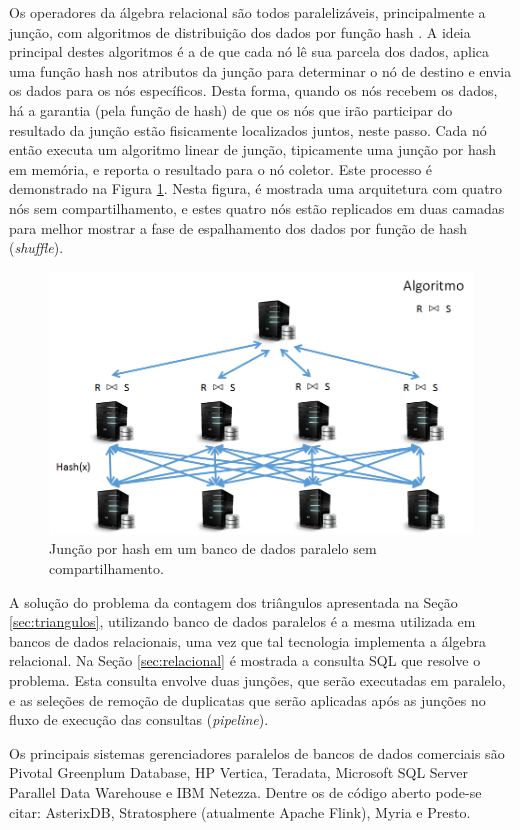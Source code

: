 Os operadores da álgebra relacional são todos paralelizáveis, principalmente
a junção, com algoritmos de distribuição dos dados por função hash 
\citep{Schneider1989}. A ideia principal destes algoritmos é a de que cada 
nó lê sua parcela dos dados, aplica uma função hash nos atributos da
junção para determinar o nó de destino e envia os dados para os nós específicos.
Desta forma, quando os nós recebem os dados, há a garantia (pela
função de hash) de que os nós que irão participar do resultado da junção 
estão fisicamente localizados juntos, neste passo. Cada nó então executa um
algoritmo linear de junção, tipicamente uma junção por hash em memória,
e reporta o resultado para o nó coletor. Este processo é demonstrado na 
Figura \ref{fig:mpp_hashjoin}. Nesta figura, é mostrada uma arquitetura
com quatro nós sem compartilhamento, e estes quatro nós estão replicados 
em duas camadas para melhor mostrar a fase de espalhamento dos dados
por função de hash (\emph{shuffle}).

\begin{figure}[!htbp]
        \centering
        \includegraphics[width=\linewidth]{./mpp_hashjoin.png}
        \caption{Junção por hash em um banco de dados paralelo sem compartilhamento.}
        \label{fig:mpp_hashjoin}
\end{figure}

A solução do problema da contagem dos triângulos apresentada na Seção \ref{sec:triangulos}, utilizando
banco de dados paralelos é a mesma utilizada em bancos de dados relacionais, uma vez que tal tecnologia 
implementa a álgebra relacional. Na Seção \ref{sec:relacional} é mostrada 
a consulta SQL que resolve o problema. Esta consulta envolve duas junções, 
que serão executadas em paralelo, e as seleções de remoção de duplicatas que
serão aplicadas após as junções no fluxo de execução das consultas (\emph{pipeline}).

Os principais sistemas gerenciadores paralelos de bancos de dados comerciais são Pivotal Greenplum Database, 
HP Vertica, Teradata, Microsoft SQL Server Parallel Data Warehouse e IBM Netezza. Dentre os de código 
aberto pode-se citar: AsterixDB, Stratosphere (atualmente Apache Flink), Myria e Presto.

